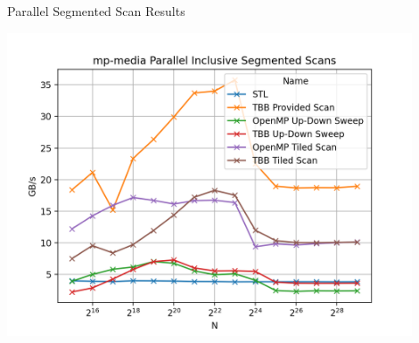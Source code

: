 \begin{frame}{Parallel Segmented Scan Results}
 
  \centering
  \vspace{-5pt}
  \includegraphics[width=0.90\textwidth]{"graphs/mp-media Parallel Inclusive Segmented Scans"}
 
\end{frame}



